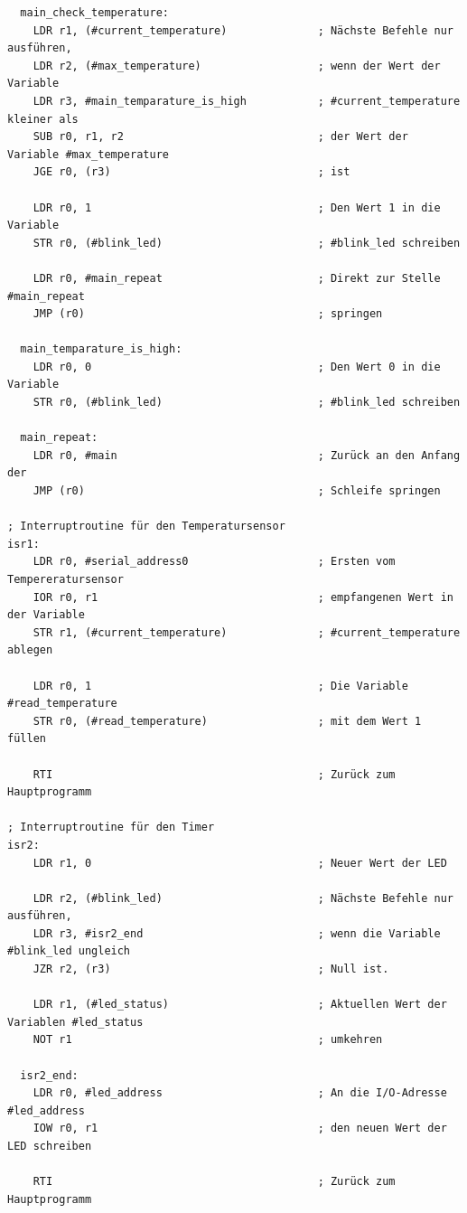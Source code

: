 {\begin{verbatim}
  main_check_temperature:
    LDR r1, (#current_temperature)              ; Nächste Befehle nur ausführen,
    LDR r2, (#max_temperature)                  ; wenn der Wert der Variable
    LDR r3, #main_temparature_is_high           ; #current_temperature kleiner als
    SUB r0, r1, r2                              ; der Wert der Variable #max_temperature
    JGE r0, (r3)                                ; ist

    LDR r0, 1                                   ; Den Wert 1 in die Variable
    STR r0, (#blink_led)                        ; #blink_led schreiben

    LDR r0, #main_repeat                        ; Direkt zur Stelle #main_repeat
    JMP (r0)                                    ; springen

  main_temparature_is_high:
    LDR r0, 0                                   ; Den Wert 0 in die Variable
    STR r0, (#blink_led)                        ; #blink_led schreiben

  main_repeat:
    LDR r0, #main                               ; Zurück an den Anfang der
    JMP (r0)                                    ; Schleife springen

; Interruptroutine für den Temperatursensor
isr1:
    LDR r0, #serial_address0                    ; Ersten vom Tempereratursensor
    IOR r0, r1                                  ; empfangenen Wert in der Variable
    STR r1, (#current_temperature)              ; #current_temperature ablegen

    LDR r0, 1                                   ; Die Variable #read_temperature
    STR r0, (#read_temperature)                 ; mit dem Wert 1 füllen

    RTI                                         ; Zurück zum Hauptprogramm

; Interruptroutine für den Timer
isr2:
    LDR r1, 0                                   ; Neuer Wert der LED

    LDR r2, (#blink_led)                        ; Nächste Befehle nur ausführen,
    LDR r3, #isr2_end                           ; wenn die Variable #blink_led ungleich
    JZR r2, (r3)                                ; Null ist.

    LDR r1, (#led_status)                       ; Aktuellen Wert der Variablen #led_status
    NOT r1                                      ; umkehren

  isr2_end:
    LDR r0, #led_address                        ; An die I/O-Adresse #led_address
    IOW r0, r1                                  ; den neuen Wert der LED schreiben

    RTI                                         ; Zurück zum Hauptprogramm
\end{verbatim}
}
